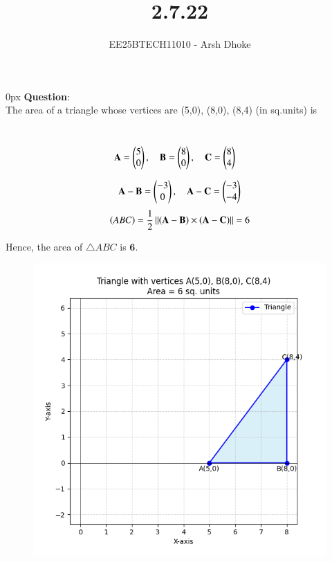 \documentclass[journal]{IEEEtran}
\begin{document}

\vspace{3cm}

\title{2.7.22}
\author{EE25BTECH11010 - Arsh Dhoke}
{\let\newpage\relax\maketitle}

\renewcommand{\thefigure}{\theenumi}
\renewcommand{\thetable}{\theenumi}
\setlength{\intextsep}{10pt}
\renewcommand{\thetable}{\theenumi}

\parindent 0px
\textbf{Question}:\\
The area of a triangle whose vertices are (5,0), (8,0), (8,4) (in sq.units) is

\solution \\



\begin{align}
\mathbf{A} &= \begin{pmatrix}5\\0\end{pmatrix}, \quad 
\mathbf{B} = \begin{pmatrix}8\\0\end{pmatrix}, \quad 
\mathbf{C} = \begin{pmatrix}8\\4\end{pmatrix}
\end{align}

\begin{align}
	\mathbf{A}-\mathbf{B}=\begin{pmatrix}-3\\0\end{pmatrix},\quad \mathbf{A}-\mathbf{C}=\begin{pmatrix}-3\\-4\end{pmatrix}
\end{align}
\begin{align}
	\left(ABC\right)=\frac{1}{2}\left\lVert\left(\mathbf{A}-\mathbf{B}\right)\times\left(\mathbf{A}-\mathbf{C}\right)\right\rVert=6
\end{align}

Hence, the area of $\triangle ABC$ is $\textbf{6}$.

\begin{figure}[ht!]
\centering
\includegraphics[height=0.6\textheight, keepaspectratio]{figs/q4.png}
\end{figure}
\end{document}
